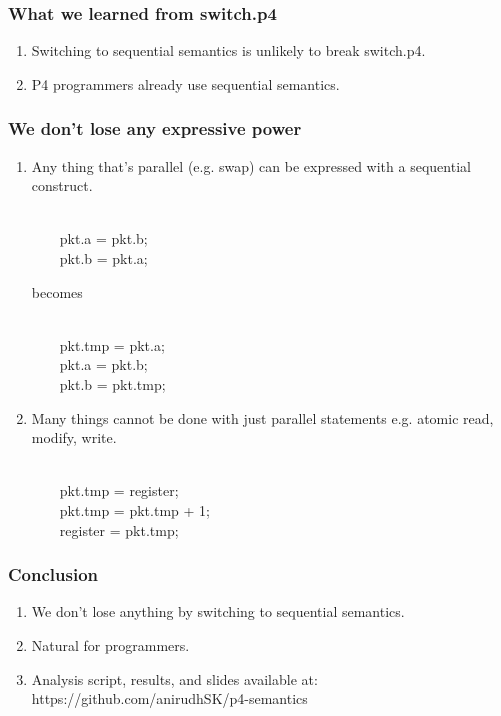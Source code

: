 \documentclass[aspectratio=169]{beamer}
\begin{document}
\begin{frame}[fragile]
  \frametitle{What we learned from switch.p4}
  \begin{enumerate}
    \item<1-> Switching to sequential semantics is unlikely to break switch.p4.
    \item<2-> P4 programmers already use sequential semantics.
  \end{enumerate}
\end{frame}

\begin{frame}[fragile]
  \frametitle{We don't lose any expressive power}
  \begin{enumerate}
  \item<1-> Any thing that's parallel (e.g. swap) can be expressed with a sequential construct.
    \begin{texttt} \\
    \ \ \ \   pkt.a = pkt.b; \\
    \ \ \ \   pkt.b = pkt.a; \\
    \end{texttt}
    becomes
    \begin{texttt} \\
    \ \ \ \   pkt.tmp = pkt.a; \\
    \ \ \ \   pkt.a = pkt.b; \\
    \ \ \ \   pkt.b = pkt.tmp; \\
    \end{texttt}
  \item<2-> Many things cannot be done with just parallel statements e.g. atomic read, modify, write.
    \begin{texttt} \\
    \ \ \ \   pkt.tmp = register; \\
    \ \ \ \   pkt.tmp = pkt.tmp  + 1; \\
    \ \ \ \   register = pkt.tmp; \\
    \end{texttt}
  \end{enumerate}
\end{frame}

\begin{frame}[fragile]
  \frametitle{Conclusion}
  \begin{enumerate}
    \item<1-> We don't lose anything by switching to sequential semantics.
    \item<2-> Natural for programmers.
    \item<3-> Analysis script, results, and slides available at: https://github.com/anirudhSK/p4-semantics
  \end{enumerate}
\end{frame}
\end{document}
